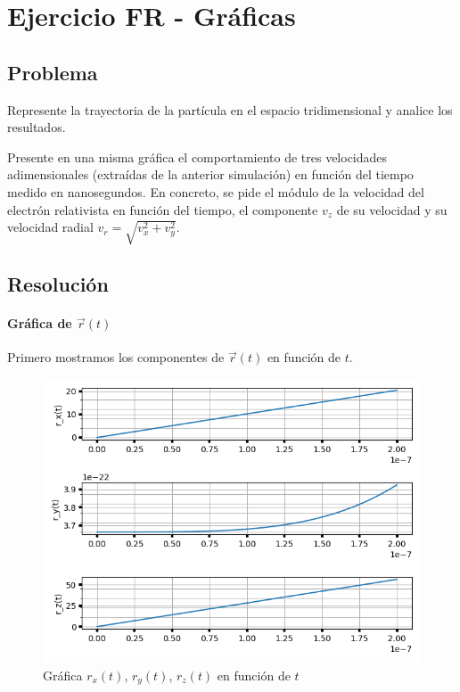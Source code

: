 \section{Ejercicio FR - Gráficas}

\subsection{Problema}

Represente la trayectoria de la partícula en el espacio tridimensional y analice los resultados.

Presente en una misma gráfica el comportamiento de tres velocidades adimensionales (extraídas de la anterior simulación) en función del tiempo medido en nanosegundos. En concreto, se pide el módulo de la velocidad del electrón relativista en función del tiempo, el componente $v_z$ de su velocidad y su velocidad radial $v_r = \sqrt{ v_x^2 + v_y^2}$. 

\subsection{Resolución}

\paragraph{Gráfica de $\vec{r}(t)$} 
Primero mostramos los componentes de $\vec{r}(t)$ en función de $t$.

\begin{figure}[H]
	\includegraphics[width=\linewidth]{figures/rel_rx_ry_rz.png}
	\caption{Gráfica $r_x(t)$, $r_y(t)$, $r_z(t)$ en función de $t$}
	\label{fig:rel_rx_ry_rz_t}
\end{figure}

